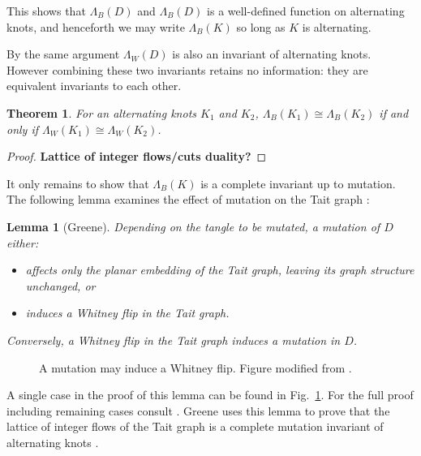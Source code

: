 \documentclass[12pt]{report}
\newcommand{\notered}[1]{{\color{Red} \textbf{#1}}}
\newtheorem*{theorem}{Theorem}
\newtheorem*{lemma}{Lemma}
\begin{document}
This shows that $\Lambda_{B}(D)$ and $\Lambda_{B}(D)$ is a well-defined function on alternating knots, and henceforth we may write $\Lambda_{B}(K)$ so long as $K$ is alternating.

By the same argument $\Lambda_{W}(D)$ is also an invariant of alternating knots. However combining these two invariants retains no information: they are equivalent invariants to each other.

\begin{theorem}
For an alternating knots $K_{1}$ and $K_{2}$, $\Lambda_{B}(K_{1}) \cong \Lambda_{B}(K_{2})$ if and only if $\Lambda_{W}(K_{1}) \cong \Lambda_{W}(K_{2})$.
\end{theorem}

\begin{proof}
\notered{Lattice of integer flows/cuts duality?}
\end{proof}

It only remains to show that $\Lambda_{B}(K)$ is a complete invariant up to mutation. The following lemma examines the effect of mutation on the Tait graph \cite[Lemma 4.5]{lattices-graphs-mutation}:

\begin{lemma}[Greene]
Depending on the tangle to be mutated, a mutation of $D$ either:
\begin{itemize}
\item affects only the planar embedding of the Tait graph, leaving its graph structure unchanged, or
\item induces a Whitney flip in the Tait graph.
\end{itemize}
Conversely, a Whitney flip in the Tait graph induces a mutation in $D$.
\end{lemma}

\begin{figure}[hbt!]
	\centering
	\def\svgscale{0.65}
	
	
	\caption{A mutation may induce a Whitney flip. Figure modified from \cite[Fig.~2]{lattices-graphs-mutation}.}
	\label{fig:mutation-whitney-flip}
\end{figure}

A single case in the proof of this lemma can be found in Fig.~\ref{fig:mutation-whitney-flip}. For the full proof including remaining cases consult \cite[Fig. 2-4]{lattices-graphs-mutation}. Greene uses this lemma to prove that the lattice of integer flows of the Tait graph is a complete mutation invariant of alternating knots \cite[Proposition 4.4]{lattices-graphs-mutation}.
\end{document}
